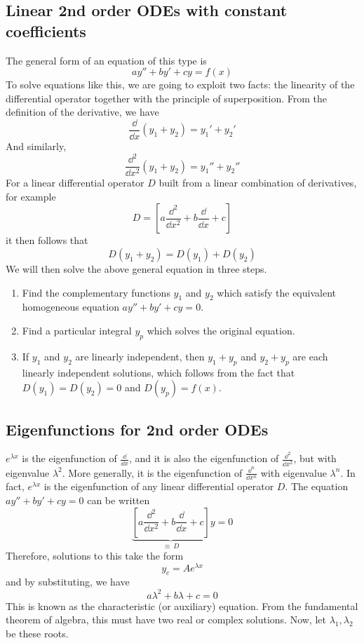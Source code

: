 \subsection{Linear 2nd order ODEs with constant coefficients}
The general form of an equation of this type is
\[
	ay'' + by' + cy = f(x)
\]
To solve equations like this, we are going to exploit two facts: the linearity of the differential operator together with the principle of superposition.
From the definition of the derivative, we have
\[
	\frac{\dd}{\dd{x}}(y_1 + y_2) = y_1' + y_2'
\]
And similarly,
\[
	\frac{\dd^2}{\dd{x}^2}(y_1 + y_2) = y_1'' + y_2''
\]
For a linear differential operator \(D\) built from a linear combination of derivatives, for example
\[
	D = \left[ a \frac{\dd^2}{\dd{x}^2} + b\frac{\dd}{\dd{x}} + c \right]
\]
it then follows that
\[
	D(y_1 + y_2) = D(y_1) + D(y_2)
\]
We will then solve the above general equation in three steps.
\begin{enumerate}
	\item Find the complementary functions \(y_1\) and \(y_2\) which satisfy the equivalent homogeneous equation \(ay'' + by' + cy = 0\).
	\item Find a particular integral \(y_p\) which solves the original equation.
	\item If \(y_1\) and \(y_2\) are linearly independent, then \(y_1 + y_p\) and \(y_2 + y_p\) are each linearly independent solutions, which follows from the fact that \(D(y_1) = D(y_2) = 0\) and \(D(y_p) = f(x)\).
\end{enumerate}

\subsection{Eigenfunctions for 2nd order ODEs}
\(e^{\lambda x}\) is the eigenfunction of \(\frac{\dd}{\dd{x}}\), and it is also the eigenfunction of \(\frac{\dd^2}{\dd{x}^2}\), but with eigenvalue \(\lambda^2\).
More generally, it is the eigenfunction of \(\frac{\dd^n}{\dd{x}^n}\) with eigenvalue \(\lambda^n\).
In fact, \(e^{\lambda x}\) is the eigenfunction of any linear differential operator \(D\).
The equation \( ay'' + by' + cy = 0 \) can be written
\[
	\underbrace{\left[ a \frac{\dd^2}{\dd{x}^2} + b\frac{\dd}{\dd{x}} + c \right]}_{\equiv\ D} y = 0
\]
Therefore, solutions to this take the form
\[
	y_c = Ae^{\lambda x}
\]
and by substituting, we have
\[
	a \lambda^2 + b\lambda + c = 0
\]
This is known as the characteristic (or auxiliary) equation.
From the fundamental theorem of algebra, this must have two real or complex solutions.
Now, let \(\lambda_1, \lambda_2\) be these roots.


